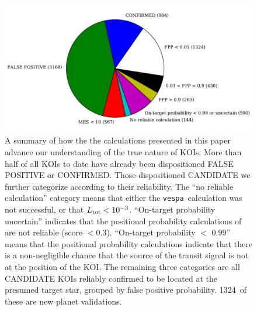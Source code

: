 \documentclass{emulateapj}
\newcommand{\figlabel}[1]{\label{fig:#1}}
\newcommand{\nvalnew}{1324} %
\newcommand{\nfpnew}{424}  %
\newcommand{\posprobthresh}{0.3}
\newcommand{\vespa}{\texttt{vespa}}
\begin{document}
\begin{figure}[p]
\begin{center}
\includegraphics[width=7in]{figures/fpp_pie.pdf}
\end{center}
\caption{A summary of how the the calculations presented in this paper
  advance our understanding of the true nature of KOIs.  More than
  half of all KOIs to date have already been dispositioned FALSE
  POSITIVE or CONFIRMED.  Those dispositioned CANDIDATE we further
  categorize according to their reliability.  The ``no reliable
  calculation'' category means that either the \vespa\ calculation was
  not successful, or that $L_{\rm tot} < 10^{-3}$.  ``On-target
  probability uncertain'' indicates that the positional probability
  calculations of \citet{Bryson:KSCI} are not reliable (score $<
  \posprobthresh$).  ``On-target probability $<$ 0.99'' means that the positional
  probability calculations indicate that there is a non-negligible
  chance that the source of the transit signal is not at the position
  of the KOI.  The remaining three categories are all CANDIDATE KOIs
  reliably confirmed to be located at the presumed target star,
  grouped by false positive probability.  \nvalnew\ of these are new
  planet validations.%
  \figlabel{fpppie}}
\end{figure}
\end{document}
